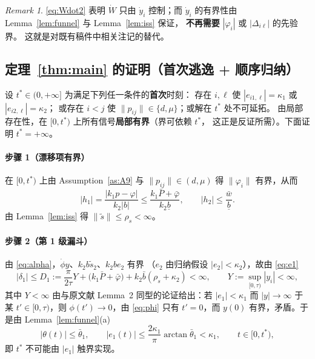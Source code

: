 \documentclass[11pt,a4paper]{article}
\newcommand{\ub}{\underline{b}}
\theoremstyle{plain}
\theoremstyle{definition}
\theoremstyle{remark}
\newtheorem{remark}[theorem]{Remark}
\begin{document}
\begin{remark}
\eqref{eq:Wdot2} 表明 $\dot W$ 只由 $\dot y_i$ 控制；而 $\dot y_i$ 的有界性由
Lemma~\ref{lem:funnel} 与 Lemma~\ref{lem:iss} 保证，
\textbf{不再需要} $|\varphi_i|$ 或 $|\Delta_{i\ell}|$ 的先验界。
这就是对既有稿件中相关注记的替代。
\end{remark}

\subsection{定理~\ref{thm:main} 的证明（首次逃逸 + 顺序归纳）}
设 $t^\ast\in(0,+\infty]$ 为满足下列任一条件的\textbf{首次}时刻：
存在 $i,\ell$ 使 $|e_{i1,\ell}|=\kappa_1$ 或 $|e_{i2,\ell}|=\kappa_2$；
或存在 $i<j$ 使 $\|p_{ij}\|\in\{d,\mu\}$；或解在 $t^\ast$ 处不可延拓。
由局部存在性，在 $[0,t^\ast)$ 上所有信号\textbf{局部有界}（界可依赖 $t^\ast$，
这正是反证所需）。下面证明 $t^\ast=+\infty$。

\paragraph{步骤 1（漂移项有界）}
在 $[0,t^\ast)$ 上由 Assumption~\ref{as:A9} 与 $\|p_{ij}\|\in(d,\mu)$ 得
$\|\varphi_i\|$ 有界，从而
\begin{equation*}
|h_1|=\frac{|k_1p-\varphi|}{k_2|b|}\le\frac{k_1\bar P+\bar\varphi}{k_2\ub},
\qquad |h_2|\le\frac{\bar w}{\ub}.
\end{equation*}
由 Lemma~\ref{lem:iss} 得 $\|\tilde s\|\le\rho_s<\infty$。

\paragraph{步骤 2（第 1 级漏斗）}
由 \eqref{eq:alpha}，$\dot\phi y$、$k_2b\tilde s_2$、$k_2be_2$ 有界
（$e_2$ 由归纳假设 $|e_2|<\kappa_2$），故由 \eqref{eq:e1}
\begin{equation*}
|\delta_1|\le D_1:=\frac{\pi}{2\tau}Y+\bigl(k_1\bar P+\bar\varphi\bigr)
+k_2\bar b(\rho_s+\kappa_2)<\infty,
\qquad Y:=\sup_{[0,\tau)}|y_i|<\infty,
\end{equation*}
其中 $Y<\infty$ 由与原文献 Lemma~2 同型的论证给出：若 $|e_1|<\kappa_1$ 而
$|y|\to\infty$ 于某 $t'\in[0,\tau)$，则 $\phi(t')\to0$，由 \eqref{eq:phi} 只有
$t'=0$，而 $y(0)$ 有界，矛盾。于是由 Lemma~\ref{lem:funnel}(a)
\begin{equation*}
|\theta(t)|\le\bar\theta_1,\qquad
|e_1(t)|\le\frac{2\kappa_1}{\pi}\arctan\bar\theta_1<\kappa_1,
\qquad t\in[0,t^\ast),
\end{equation*}
即 $t^\ast$ 不可能由 $|e_1|$ 触界实现。
\end{document}
